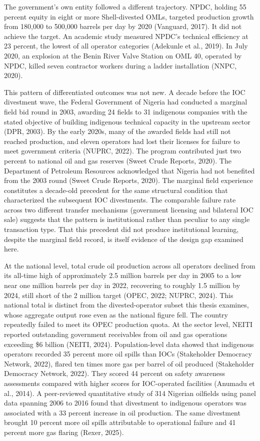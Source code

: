 The government's own entity followed a different trajectory. NPDC,
holding 55 percent equity in eight or more Shell-divested OMLs, targeted
production growth from 180,000 to 500,000 barrels per day by 2020
(Vanguard, 2017). It did not achieve the target. An academic study
measured NPDC's technical efficiency at 23 percent, the lowest of all
operator categories (Adekunle et al., 2019). In July 2020, an explosion
at the Benin River Valve Station on OML 40, operated by NPDC, killed
seven contractor workers during a ladder installation (NNPC, 2020).

This pattern of differentiated outcomes was not new. A decade before the
IOC divestment wave, the Federal Government of Nigeria had conducted a
marginal field bid round in 2003, awarding 24 fields to 31 indigenous
companies with the stated objective of building indigenous technical
capacity in the upstream sector (DPR, 2003). By the early 2020s, many of
the awarded fields had still not reached production, and eleven
operators had lost their licenses for failure to meet government
criteria (NUPRC, 2022). The program contributed just two percent to
national oil and gas reserves (Sweet Crude Reports, 2020). The
Department of Petroleum Resources acknowledged that Nigeria had not
benefited from the 2003 round (Sweet Crude Reports, 2020). The marginal
field experience constitutes a decade-old precedent for the same
structural condition that characterized the subsequent IOC divestments.
The comparable failure rate across two different transfer mechanisms
(government licensing and bilateral IOC sale) suggests that the pattern
is institutional rather than peculiar to any single transaction type.
That this precedent did not produce institutional learning, despite the
marginal field record, is itself evidence of the design gap examined
here.

At the national level, total crude oil production across all operators
declined from its all-time high of approximately 2.5 million barrels per
day in 2005 to a low near one million barrels per day in 2022,
recovering to roughly 1.5 million by 2024, still short of the 2 million
target (OPEC, 2022; NUPRC, 2024). This national total is distinct from
the divested-operator subset this thesis examines, whose aggregate
output rose even as the national figure fell. The country repeatedly
failed to meet its OPEC production quota. At the sector level, NEITI
reported outstanding government receivables from oil and gas operations
exceeding \$6 billion (NEITI, 2024). Population-level data showed that
indigenous operators recorded 35 percent more oil spills than IOCs
(Stakeholder Democracy Network, 2022), flared ten times more gas per
barrel of oil produced (Stakeholder Democracy Network, 2022). They
scored 44 percent on safety awareness assessments compared with higher
scores for IOC-operated facilities (Anumadu et al., 2014). A
peer-reviewed quantitative study of 314 Nigerian oilfields using panel
data spanning 2006 to 2016 found that divestment to indigenous operators
was associated with a 33 percent increase in oil production. The same
divestment brought 10 percent more oil spills attributable to
operational failure and 41 percent more gas flaring (Rexer, 2025).


